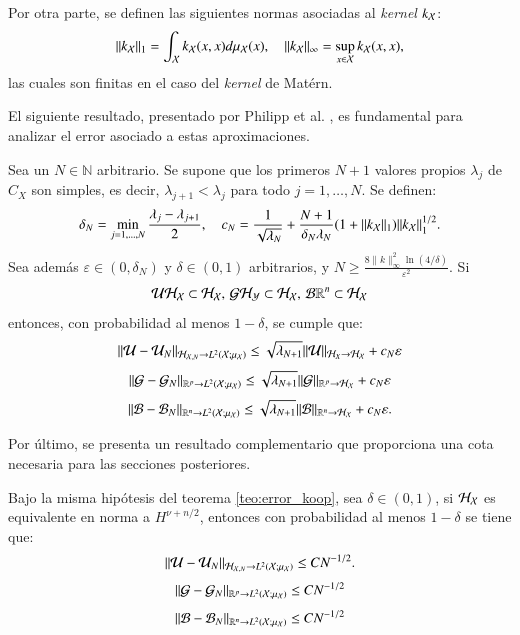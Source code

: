 Por otra parte, se definen las siguientes normas asociadas al \textit{kernel} \( k_{\mathcal{X}} \):
\begin{equation*}
    \| k_{\mathcal{X}} \|_1 = \int_{\mathcal{X}} k_{\mathcal{X}} (x,x) d \mu_{\mathcal{X}} (x), \quad \| k_{\mathcal{X}} \|_\infty = \sup_{x \in \mathcal{X}} k_{\mathcal{X}} (x,x),
\end{equation*}
las cuales son finitas en el caso del \textit{kernel} de Matérn.

El siguiente resultado, presentado por Philipp et al. \cite{Philipp2024ErrorOperator}, es fundamental para analizar el error asociado a estas aproximaciones.
\begin{teo}
    Sea un \( N \in \mathbb{N} \) arbitrario. Se supone que los primeros \( N + 1 \) valores propios \( \lambda_j \) de \( C_X \) son simples, es decir, \( \lambda_{j+1} < \lambda_j \) para todo \( j = 1, \ldots, N \). Se definen:
    \[
    \delta_N = \min_{j=1, \ldots, N} \frac{\lambda_j - \lambda_{j+1}}{2}, \quad c_N = \frac{1}{\sqrt{\lambda_N}} + \frac{N + 1}{\delta_N \lambda_N} (1 + \|k_{\mathcal{X}}\|_{1}) \|k_{\mathcal{X}} \|^{1/2}_{1}.
    \]
    Sea además \( \varepsilon \in (0, \delta_N) \) y \( \delta \in (0, 1) \) arbitrarios, y \( N \geq  \frac{8\|k\|^2_\infty \ln(4/\delta)}{\varepsilon^2} \). Si 
    \begin{equation*}
        \mathcal{U} \mathcal{H}_{\mathcal{X}} \subset \mathcal{H}_{\mathcal{X}}, \, \mathcal{G} \mathcal{H}_{\mathcal{Y}} \subset \mathcal{H}_{\mathcal{X}}, \, \mathcal{B} \mathbb{R}^n \subset \mathcal{H}_{\mathcal{X}}
    \end{equation*}
    entonces, con probabilidad al menos \( 1 - \delta \), se cumple que:
    \[
    \|\mathcal{U} - \mathcal{U}_N \|_{\mathcal{H}_{\mathcal{X}, N} \to L^2(\mathcal{X}; \mu_{\mathcal{X}})} \leq \sqrt{\lambda_{N+1}} \|\mathcal{U} \|_{\mathcal{H}_{X} \to \mathcal{H_{\mathcal{X}}}} + c_N \varepsilon
    \]
    \[
    \|\mathcal{G} - \mathcal{G}_N \|_{\mathbb{R}^p \to L^2(\mathcal{X}; \mu_{\mathcal{X}})} \leq \sqrt{\lambda_{N+1}} \|\mathcal{G} \|_{\mathbb{R}^p \to \mathcal{H_{\mathcal{X}}}} + c_N \varepsilon
    \]
    \[
    \|\mathcal{B} - \mathcal{B}_N \|_{\mathbb{R}^n \to L^2(\mathcal{X}; \mu_{\mathcal{X}})} \leq \sqrt{\lambda_{N+1}} \|\mathcal{B} \|_{\mathbb{R}^n \to \mathcal{H_{\mathcal{X}}}} + c_N \varepsilon.
    \]
    \label{teo:error_koop}
\end{teo}

Por último, se presenta un resultado complementario que proporciona una cota necesaria para las secciones posteriores.

\begin{teo}
    Bajo la misma hipótesis del teorema \ref{teo:error_koop}, sea $\delta \in (0, 1)$,  si $\mathcal{H}_{\mathcal{X}}$ es equivalente en norma a $H^{\nu + n/2}$, entonces con probabilidad al menos $1 - \delta$ se tiene que:
    \begin{equation}
        \| \mathcal{U} - \mathcal{U}_N \|_{\mathcal{H}_{\mathcal{X}, N} \to L^2(\mathcal{X}; \mu_{\mathcal{X}})} \leq C N^{-1/2}.
        \label{eq:kEDMD_bound}
    \end{equation}
    \begin{equation*}
    \| \mathcal{G} - \mathcal{G}_N \|_{\mathbb{R}^p \to L^2(\mathcal{X}; \mu_{\mathcal{X}})} \leq C N^{-1/2}
    \end{equation*}
    \begin{equation*}
    \| \mathcal{B} - \mathcal{B}_N \|_{\mathbb{R}^n \to L^2(\mathcal{X}; \mu_{\mathcal{X}})} \leq C N^{-1/2}
    \end{equation*}
    \label{teo:error_koop_sqrt_N}
\end{teo}

